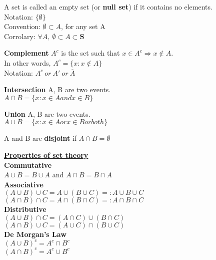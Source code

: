 \documentclass[12pt, oneside, letterpaper]{notes}
\begin{document}
\begin{mydef}
  A set is called an empty set (or \textbf{null set}) if it contains 
  no elements.\\
  \indent Notation: $\{ \emptyset \}$ \\
  \indent Convention: $\emptyset \subset A$, for any set A \\
  \indent Corrolary: $\forall A, \: \emptyset \subset A \subset \textbf{S}$
\end{mydef}

\begin{mydef}
  \textbf{Complement} $A^c$ is the set such that $x \in A^c 
  \Rightarrow x \notin A$.\\
  \indent In other words, $A^c = \{ x : x \notin A \}$ \\
  \indent Notation: $A^c \: or \: A' \: or \: \overline{A}$
\end{mydef}

\begin{mydef}
  \textbf{Intersection} A, B are two events.  \\
  \indent $A \cap B = \{x: x \in A and x \in B\}$
\end{mydef}

\begin{mydef}
  \textbf{Union} A, B are two events. \\
  \indent $A \cup B = \{x: x \in A or x \in B or both\}$
\end{mydef}

\begin{mydef}
  A and B are \textbf{disjoint} if $A \cap B = \emptyset$
\end{mydef}

\noindent \underline{\textbf{Properties of set theory}}  \\
\textbf{Commutative}  \\
\indent $A \cup B = B \cup A$ and $A \cap B = B \cap A$ \\
\textbf{Associative}\\
\indent $(A \cup B) \cup C = A \cup (B \cup C) =: A \cup B \cup C$ \\
\indent $(A \cap B) \cap C = A \cap (B \cap C) =: A \cap B \cap C$ \\
\textbf{Distributive}\\
\indent $(A \cup B) \cap C = (A \cap C) \cup (B \cap C)$ \\
\indent $(A \cap B) \cup C = (A \cup C) \cap (B \cup C)$ \\
\textbf{De Morgan's Law}\\
\indent $(A \cup B)^c = A^c \cap B^c$ \\
\indent $(A \cap B)^c = A^c \cup B^c$ \\
\end{document}
